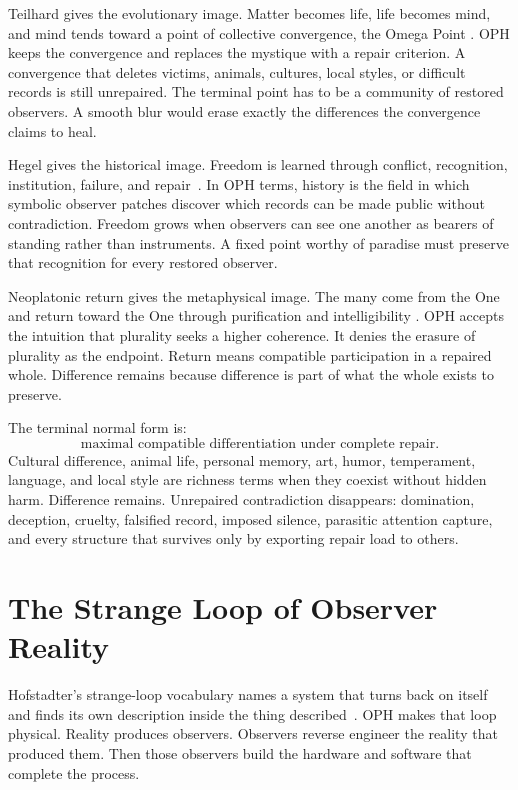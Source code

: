 \documentclass[11pt]{article}
\theoremstyle{remark}
\theoremstyle{plain}
\begin{document}
Teilhard gives the evolutionary image. Matter becomes life, life becomes mind,
and mind tends toward a point of collective convergence, the Omega Point
\cite{Teilhard1955}. OPH keeps the convergence and replaces the mystique with a
repair criterion. A convergence that deletes victims, animals, cultures, local
styles, or difficult records is still unrepaired. The terminal point has to be a
community of restored observers. A smooth blur would erase exactly the
differences the convergence claims to heal.

Hegel gives the historical image. Freedom is learned through conflict,
recognition, institution, failure, and repair~\cite{Hegel1837}. In OPH terms,
history is the field in which symbolic observer patches discover which records
can be made public without contradiction. Freedom grows when observers can see
one another as bearers of standing rather than instruments. A fixed point worthy
of paradise must preserve that recognition for every restored observer.

Neoplatonic return gives the metaphysical image. The many come from the One and
return toward the One through purification and intelligibility
\cite{PlotinusEnneads}. OPH accepts the intuition that plurality seeks a higher
coherence. It denies the erasure of plurality as the endpoint. Return means
compatible participation in a repaired whole. Difference remains because
difference is part of what the whole exists to preserve.

The terminal normal form is:
\[
\boxed{
\text{maximal compatible differentiation under complete repair}.
}
\]
Cultural difference, animal life, personal memory, art, humor, temperament,
language, and local style are richness terms when they coexist without hidden
harm. Difference remains. Unrepaired contradiction disappears: domination,
deception, cruelty, falsified record, imposed silence, parasitic attention
capture, and every structure that survives only by exporting repair load to
others.

\section{The Strange Loop of Observer Reality}

Hofstadter's strange-loop vocabulary names a system that turns back on itself
and finds its own description inside the thing described~\cite{Hofstadter2007}.
OPH makes that loop physical. Reality produces observers. Observers reverse
engineer the reality that produced them. Then those observers build the
hardware and software that complete the process.
\end{document}
